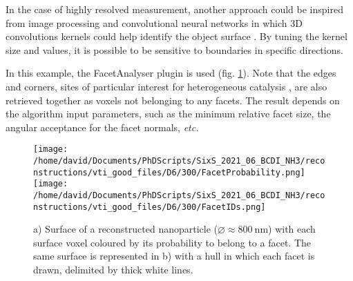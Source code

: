 In the case of highly resolved measurement, another approach could be inspired from  image processing and convolutional neural networks in which 3D convolutions kernels could help identify the object surface \parencite{RaschkaMirjalili2019}.
By tuning the kernel size and values, it is possible to be sensitive to boundaries in specific directions.

In this example, the FacetAnalyser plugin is used (fig. \ref{fig:FacetsParaview}). Note that the edges and corners, sites of particular interest for heterogeneous catalysis \parencite{Taylor1925}, are also retrieved together as voxels not belonging to any facets.
The result depends on the algorithm input parameters, such as the minimum relative facet size, the angular acceptance for the facet normals, \textit{etc.}

\begin{figure}
    \centering
    \texttt{[image: /home/david/Documents/PhDScripts/SixS\_2021\_06\_BCDI\_NH3/reconstructions/vti\_good\_files/D6/300/FacetProbability.png]}
    \texttt{[image: /home/david/Documents/PhDScripts/SixS\_2021\_06\_BCDI\_NH3/reconstructions/vti\_good\_files/D6/300/FacetIDs.png]}
    \caption{
    a) Surface of a reconstructed nanoparticle ($\diameter \approx \qty{800}{\nm}$) with each surface voxel coloured by its probability to belong to a facet.
    The same surface is represented in b) with a hull in which each facet is drawn, delimited by thick white lines.
    }
    \label{fig:FacetsParaview}
\end{figure}

\begin{table}
    \begin{center}
    \end{center}
    \caption{
    The output of  is a list of values for each facet.
    The accessible features are the facet size, the average strain and displacement (along the [111] direction), and the coordinates of the normal to the facet surface.
    The uncertainty on the average displacement and strain corresponds to the standard deviation of the displacement and strain distribution, respectively.
    }
    \label{tab:facets}
\end{table}{}
